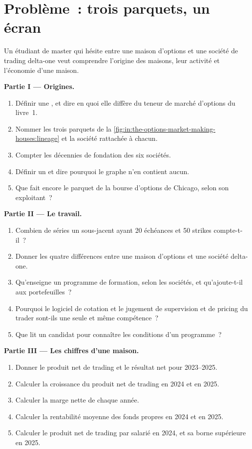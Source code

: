 \section{Problème~: trois parquets, un écran}

\begin{problem}\label{pb:in:the-options-market-making-houses:1}
Un étudiant de master qui hésite entre une maison d'options et une société de trading delta-one veut comprendre l'origine des maisons,
leur activité et l'économie d'une maison.

\medskip\noindent\textbf{Partie I --- Origines.}
\begin{enumerate}
\item Définir une , et dire en quoi elle diffère du teneur de marché d'options du livre~1.
\item Nommer les trois parquets de la \cref{fig:in:the-options-market-making-houses:lineage} et la société rattachée à chacun.
\item Compter les décennies de fondation des six sociétés.
\item Définir un  et dire pourquoi le graphe n'en contient aucun.
\item Que fait encore le parquet de la bourse d'options de Chicago, selon son exploitant~?
\end{enumerate}

\medskip\noindent\textbf{Partie II --- Le travail.}
\begin{enumerate}[resume]
\item Combien de séries un sous-jacent ayant 20 échéances et 50 strikes compte-t-il~?
\item Donner les quatre différences entre une maison d'options et une société delta-one.
\item Qu'enseigne un programme de formation, selon les sociétés, et qu'ajoute-t-il aux portefeuilles~?
\item Pourquoi le logiciel de cotation et le jugement de supervision et de pricing du trader sont-ils une seule et même compétence~?
\item Que lit un candidat pour connaître les conditions d'un programme~?
\end{enumerate}

\medskip\noindent\textbf{Partie III --- Les chiffres d'une maison.}
\begin{enumerate}[resume]
\item Donner le produit net de trading et le résultat net pour 2023--2025.
\item Calculer la croissance du produit net de trading en 2024 et en 2025.
\item Calculer la marge nette de chaque année.
\item Calculer la rentabilité moyenne des fonds propres en 2024 et en 2025.
\item Calculer le produit net de trading par salarié en 2024, et sa borne supérieure en 2025.
\end{enumerate}


\end{problem}
